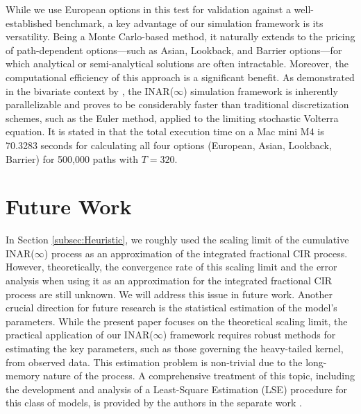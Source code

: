 \documentclass[letterpaper]{article}
\numberwithin{equation}{section}
\theoremstyle{definition}
\theoremstyle{remark}
\begin{document}
While we use European options in this test for validation against a well-established benchmark, a key advantage of our simulation framework is its versatility. Being a Monte Carlo-based method, it naturally extends to the pricing of path-dependent options—such as Asian, Lookback, and Barrier options—for which analytical or semi-analytical solutions are often intractable. Moreover, the computational efficiency of this approach is a significant benefit. As demonstrated in the bivariate context by \cite{wang2025rough}, the INAR($\infty$) simulation framework is inherently parallelizable and proves to be considerably faster than traditional discretization schemes, such as the Euler method, applied to the limiting stochastic Volterra equation. It is stated in \cite{wang2025rough} that the total execution time on a {Mac mini M4 is 70.3283} seconds for calculating all four options (European, Asian, Lookback, Barrier) for {500,000} paths with {$T=320$}.



\section{Future Work}
In Section \ref{subsec:Heuristic}, we roughly used the scaling limit of the cumulative INAR($\infty$) process as an approximation of the integrated fractional CIR process. However, theoretically, the convergence rate of this scaling limit and the error analysis when using it as an approximation for the integrated fractional CIR process are still unknown. We will address this issue in future work. Another crucial direction for future research is the statistical estimation of the model's parameters. While the present paper focuses on the theoretical scaling limit, the practical application of our INAR($\infty$) framework requires robust methods for estimating the key parameters, such as those governing the heavy-tailed kernel, from observed data. This estimation problem is non-trivial due to the long-memory nature of the process. A comprehensive treatment of this topic, including the development and analysis of a Least-Square Estimation (LSE) procedure for this class of models, is provided by the authors in the separate work \cite{wang2024statistical}.

\end{document}
